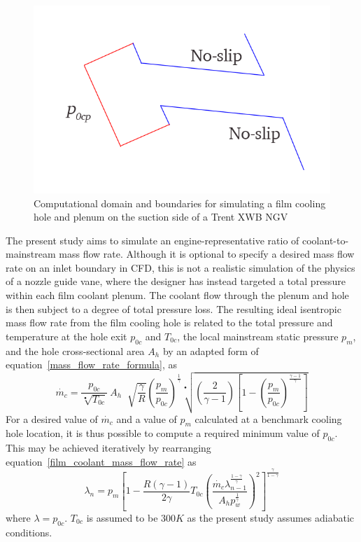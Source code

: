 \documentclass[a4paper, 11pt, oneside]{report}
\begin{document}
\begin{figure}[H]
	\centering
	\includegraphics[width=.45\textwidth]{figs/film_cooling_hole_boundary_conditions.png}
	\caption{Computational domain and boundaries for simulating a film cooling hole and plenum on the suction side of a Trent XWB NGV}
    \label{fig:film_cooling_hole_boundary_conditions}
\end{figure}

The present study aims to simulate an engine-representative ratio of coolant-to-mainstream mass flow rate. Although it is optional to specify a desired mass flow rate on an inlet boundary in CFD, this is not a realistic simulation of the physics of a nozzle guide vane, where the designer has instead targeted a total pressure within each film coolant plenum. The coolant flow through the plenum and hole is then subject to a degree of total pressure loss. The resulting ideal isentropic mass flow rate from the film cooling hole is related to the total pressure and temperature at the hole exit $p_{0c}$ and $T_{0c}$, the local mainstream static pressure $p_m$, and the hole cross-sectional area $A_h$ by an adapted form of equation~\ref{mass_flow_rate_formula}, as
\begin{equation}\label{film_coolant_mass_flow_rate}
\dot{m_c} =
\frac{p_{0c}}{\sqrt[•]{T_{0c}}} \>
A_h \;
\sqrt[]{\frac{\gamma}{R}}
\left(
    \frac{p_m}{p_{0c}}
\right)^\frac{1}{\gamma}
\sqrt[•]{
	\left(
		\frac{2}{\gamma - 1}  
	\right)
	\left[
		1 - \left( \frac{p_m}{p_{0c}} \right)^\frac{\gamma-1}{\gamma}
	\right] 
}
\end{equation}
For a desired value of $\dot{m_c}$ and a value of $p_m$ calculated at a benchmark cooling hole location, it is thus possible to compute a required minimum value of $p_{0c}$. This may be achieved iteratively by rearranging equation~\ref{film_coolant_mass_flow_rate} as
\begin{equation}\label{coolant_mass_flow_rate}
\lambda_n =
p_m
\left[
	1-
	\frac{
		R\left(\gamma-1\right)
	}{
		2\gamma
	}
	T_{0c}
	\left(
		\frac{
			\dot{m_c}
			\lambda_{n-1}^{\frac{1-\gamma}{\gamma}}
		}{
			A_h
			p_w^{\frac{1}{\gamma}}
		}
	\right)
	^2
\right]
^{\frac{\gamma}{1-\gamma}}
\end{equation}
where $\lambda=p_{0c}$. $T_{0c}$ is assumed to be $300 K$ as the present study assumes adiabatic conditions. 
\end{document}

